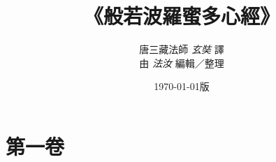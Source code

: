 \documentclass[UTF8, nofont, landscape]{ctexbook} %
\title{\zihao{0}\textbf{《般若波羅蜜多心經》}}
\author{\normalsize 唐三藏法師 \textit{玄奘} 譯 \\ \normalsize 由 \textit{法汝} 編輯／整理}
\date{\normalsize\today 版}
\begin{document}
\maketitle
\tableofcontents

\part{第一卷}
\LARGE

\end{document}
